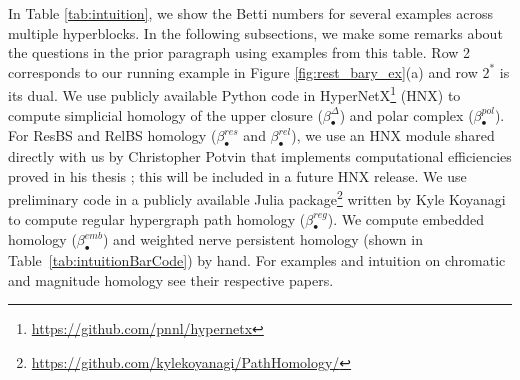 \documentclass{amsart}
\newcommand{\betti}[2]{\beta_{#2}^{#1}}
\newcommand{\cEP}[1]{{\textcolor{blue}{[Comment from Emilie: #1]}}}
\begin{document}
In Table \ref{tab:intuition}, we show the Betti numbers for several examples across multiple hyperblocks. 
In the following subsections, we make some remarks about the questions in the prior paragraph using examples from this table. 
Row 2 corresponds to our running example in Figure \ref{fig:rest_bary_ex}(a) and row $2^*$ is its dual.
We use publicly available Python code in HyperNetX\footnote{\url{https://github.com/pnnl/hypernetx}} (HNX) \cite{Praggastis2024} to compute simplicial homology of the upper closure ($\betti{\Delta}{\bullet}$) and polar complex ($\betti{pol}{\bullet}$). %
For ResBS and RelBS homology ($\betti{res}{\bullet}$ and $\betti{rel}{\bullet}$), we use an HNX module shared directly with us by Christopher Potvin that implements computational efficiencies proved in his thesis \cite{potvin2023hypergraphs}; this will be included in a future HNX release. 
We use preliminary code in a publicly available Julia package\footnote{\url{https://github.com/kylekoyanagi/PathHomology/}} written by Kyle Koyanagi to compute regular hypergraph path homology ($\betti{reg}{\bullet}$). 
We compute embedded homology ($\betti{emb}{\bullet}$) and weighted nerve persistent homology (shown in Table~\ref{tab:intuitionBarCode}) by hand. 
For examples and intuition on chromatic and magnitude homology see their respective papers.
\end{document}
